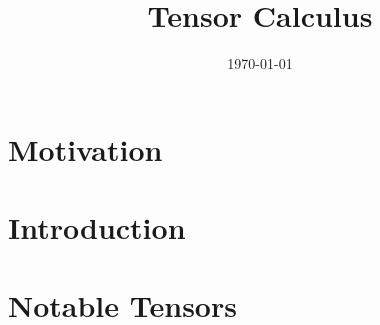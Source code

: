 \documentclass{article}
\title{Tensor Calculus}
\author{}
\date{\today}
\begin{document}
	\maketitle

	\section{Motivation}
	\label{sec: motivation}
	
	
	\section{Introduction}
	\label{sec: introduction}
	

	\section{Notable Tensors}
	\label{sec: notable_tensors}
	
	



	
	
\end{document}
